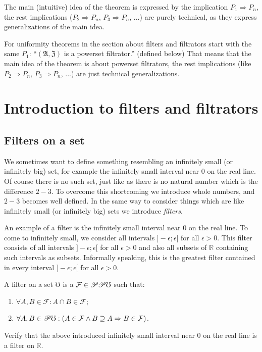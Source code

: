 The main (intuitive) idea of the theorem is expressed by the implication
$P_{1}\Rightarrow P_{n}$, the rest implications ($P_{2}\Rightarrow P_{n}$,
$P_{3}\Rightarrow P_{n}$, ...) are purely technical, as they express
generalizations of the main idea.

For uniformity theorems in the section about filters and filtrators
start with the same $P_{1}$: ``$(\mathfrak{A},\mathfrak{Z})$ is
a powerset filtrator.'' (defined below) That means that the main
idea of the theorem is about powerset filtrators, the rest implications
(like $P_{2}\Rightarrow P_{n}$, $P_{3}\Rightarrow P_{n}$, ...) are
just technical generalizations.


\section{Introduction to filters and filtrators}


\subsection{Filters on a set}

We sometimes want to define something resembling an infinitely small
(or infinitely big) set, for example the infinitely small interval
near $0$ on the real line. Of course there is no such set, just like
as there is no natural number which is the difference $2-3$. To overcome
this shortcoming we introduce whole numbers, and $2-3$ becomes well
defined. In the same way to consider things which are like infinitely
small (or infinitely big) sets we introduce \emph{filters}.

An example of a filter is the infinitely small interval near $0$
on the real line. To come to infinitely small, we consider all intervals
$]-\epsilon;\epsilon[$ for all $\epsilon>0$. This filter consists
of all intervals $]-\epsilon;\epsilon[$ for all $\epsilon>0$ and
also all subsets of $\mathbb{R}$ containing such intervals as subsets.
Informally speaking, this is the greatest filter contained in every
interval $]-\epsilon;\epsilon[$ for all $\epsilon>0$.
\begin{defn}
A filter on a set $\mho$ is a $\mathcal{F}\in\mathscr{P}\mathscr{P}\mho$
such that:
\begin{enumerate}
\item $\forall A,B\in\mathcal{F}:A\cap B\in\mathcal{F}$;
\item $\forall A,B\in\mathscr{P}\mho:(A\in\mathcal{F}\land B\supseteq A\Rightarrow B\in\mathcal{F})$.
\end{enumerate}
\end{defn}
\begin{xca}
Verify that the above introduced infinitely small interval near $0$
on the real line is a filter on $\mathbb{R}$.
\end{xca}

